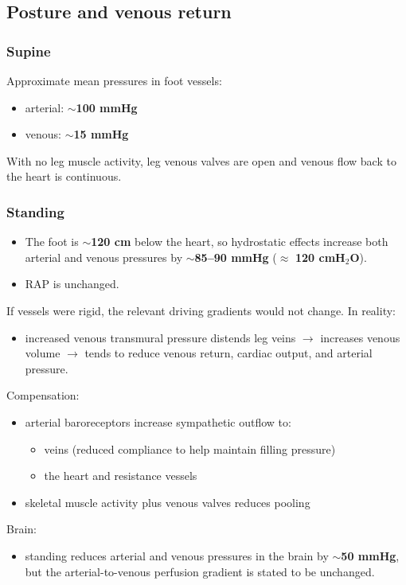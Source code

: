\documentclass[11pt,a4paper]{article}
\begin{document}
\subsection{Posture and venous return}

\subsubsection{Supine}
Approximate mean pressures in foot vessels:
\begin{itemize}
\item arterial: \textbf{$\sim$100 mmHg}
\item venous: \textbf{$\sim$15 mmHg}
\end{itemize}
With no leg muscle activity, leg venous valves are open and venous flow back to the heart is continuous.

\subsubsection{Standing}
\begin{itemize}
\item The foot is \textbf{$\sim$120 cm} below the heart, so hydrostatic effects increase both arterial and venous pressures by \textbf{$\sim$85--90 mmHg} ($\approx$ \textbf{120 cmH$_2$O}).
\item RAP is unchanged.
\end{itemize}
If vessels were rigid, the relevant driving gradients would not change. In reality:
\begin{itemize}
\item increased venous transmural pressure distends leg veins $\rightarrow$ increases venous volume $\rightarrow$ tends to reduce venous return, cardiac output, and arterial pressure.
\end{itemize}
Compensation:
\begin{itemize}
\item arterial baroreceptors increase sympathetic outflow to:
  \begin{itemize}
  \item veins (reduced compliance to help maintain filling pressure)
  \item the heart and resistance vessels
  \end{itemize}
\item skeletal muscle activity plus venous valves reduces pooling
\end{itemize}
Brain:
\begin{itemize}
\item standing reduces arterial and venous pressures in the brain by \textbf{$\sim$50 mmHg}, but the arterial-to-venous perfusion gradient is stated to be unchanged.
\end{itemize}
\end{document}
